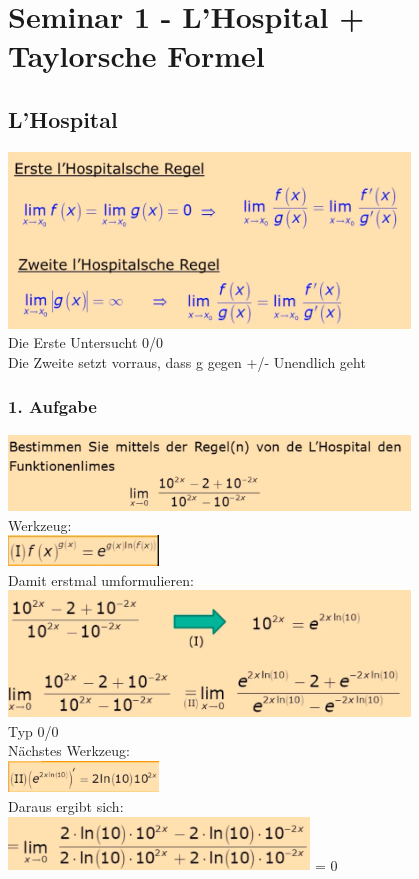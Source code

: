 \documentclass[12pt,a4paper]{article}
\begin{document}
\section{Seminar 1 - L'Hospital + Taylorsche Formel}
\subsection{L'Hospital}
\includegraphics[width=0.8\textwidth]{BIlder/S1/1.png}\\
Die Erste Untersucht 0/0\\
Die Zweite setzt vorraus, dass g gegen +/- Unendlich geht\\
\subsubsection{1. Aufgabe}
\includegraphics[width=0.8\textwidth]{BIlder/S1/2.png}\\
Werkzeug:\\
\includegraphics[width=0.3\textwidth]{BIlder/S1/3.png}\\
Damit erstmal umformulieren:\\
\includegraphics[width=0.8\textwidth]{BIlder/S1/4.png}\\
Typ 0/0\\
\newpage
Nächstes Werkzeug:\\
\includegraphics[width=0.3\textwidth]{BIlder/S1/5.png}\\
Daraus ergibt sich:\\
\includegraphics[width=0.6\textwidth]{BIlder/S1/6.png} = 0\\
\end{document}

